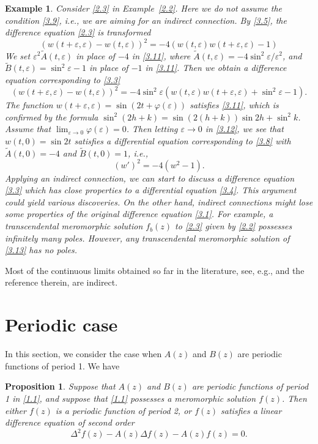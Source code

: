 \documentclass{amsart}
\newtheorem{proposition}[theorem]{Proposition}
\newtheorem{example}[theorem]{Example}
\begin{document}
\begin{example}\label{ex3.2}
Consider \eqref{2.3} in Example~\ref{2.2}.
Here we do not assume the condition \eqref{3.9}, i.e., we are aiming for an indirect connection.
By \eqref{3.5}, the difference equation \eqref{2.3} is transformed
\begin{equation}
(w(t+\varepsilon,\varepsilon)-w(t,\varepsilon))^2=-4(w(t,\varepsilon)w(t+\varepsilon,\varepsilon)-1)\label{3.11}
\end{equation}
We set $\varepsilon^2 \tilde A(t,\varepsilon)$ in place of $-4$ in \eqref{3.11}, where
$\tilde A(t,\varepsilon)=-4\sin^2\varepsilon/\varepsilon^2$, and $\tilde B(t,\varepsilon)=\sin^2\varepsilon-1$ in place of $-1$ in \eqref{3.11}. Then we obtain a difference equation
corresponding to \eqref{3.3}
\begin{equation}
(w(t+\varepsilon,\varepsilon)-w(t,\varepsilon))^2=-4\sin^2\varepsilon(w(t,\varepsilon)w(t+\varepsilon,\varepsilon)+\sin^2\varepsilon-1).\label{3.12}
\end{equation}
The function $w(t+\varepsilon,\varepsilon)=\sin(2t+\varphi(\varepsilon))$ satisfies \eqref{3.11}, which is confirmed by the formula $\sin^2(2h+k)=\sin(2(h+k))\sin2h+\sin^2k$.
Assume that $\displaystyle \lim_{\varepsilon\to0}\varphi(\varepsilon)=0$.
Then letting $\varepsilon\to0$ in \eqref{3.12}, we see that $w(t,0)=\sin2t$ satisfies a differential equation corresponding to \eqref{3.8} with
 $\tilde{A}(t,0)=-4$ and $\tilde{B}(t,0)=1$, i.e.,
\begin{equation}
(w')^2=-4(w^2-1).\label{3.13}
\end{equation}
Applying an indirect connection,
we can start to discuss a difference equation \eqref{3.3} which
has close properties to a differential equation \eqref{3.4}.
This argument could yield various discoveries. On the other hand, indirect connections
might lose some properties of the original difference equation \eqref{3.1}.
For example, a transcendental meromorphic solution $f_b(z)$ to \eqref{2.3} given by \eqref{2.2} possesses infinitely many poles.
However, any transcendental meromorphic solution of \eqref{3.13} has no poles.
\end{example}

Most of the continuous limits obtained so far in the literature, see, e.g., \cite{grammaticosnr:99,halburdk:07JPA} and the reference therein, are indirect.


\section{Periodic case}\label{periodicSec}
In this section, we consider the case when $A(z)$ and $B(z)$ are periodic functions of period 1.
We have
\begin{proposition}\label{prop4.1}
Suppose that $A(z)$ and $B(z)$ are periodic functions of period 1 in \eqref{1.1},
and suppose that \eqref{1.1} possesses a meromorphic solution $f(z)$.
Then either $f(z)$ is a periodic function of period 2,
or $f(z)$ satisfies a linear difference equation of second order
\begin{equation}
\Delta^2 f(z)-A(z)\Delta f(z)-A(z)f(z)=0.\label{4.1}
\end{equation}
\end{proposition}
\end{document}
